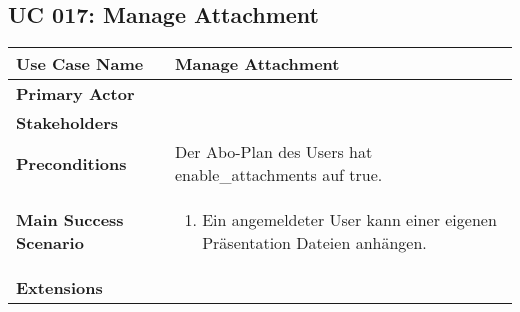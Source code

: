 \subsection{UC 017: Manage Attachment}
\label{uc:017-manage-attachment}

\begin{tabular}{|l|p{}|}
\hline
\textbf{Use Case Name} 	&	Manage Attachment	\\ \hline
\textbf{Primary Actor} 	&		\\ \hline
\textbf{Stakeholders}	&		\\ \hline
\textbf{Preconditions}	&	Der Abo-Plan des Users hat enable_attachments auf true.	\\ \hline
\textbf{Main Success Scenario}	&
\begin{enumerate}
	\item Ein angemeldeter User kann einer eigenen Präsentation Dateien anhängen.
\end{enumerate}
\\ \hline
\textbf{Extensions}	& 	\\ \hline
\end{tabular}